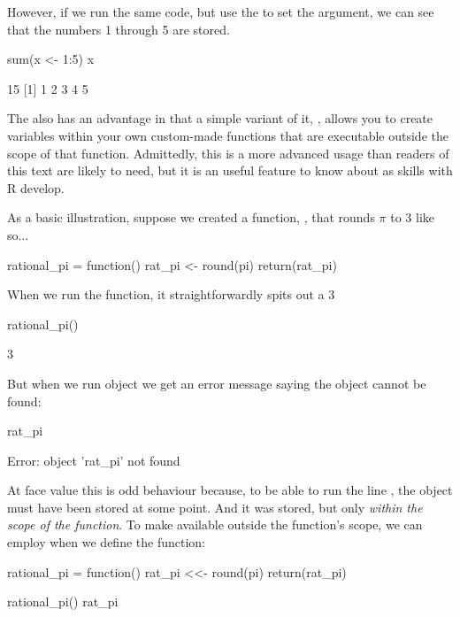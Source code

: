 \noindent
However, if we run the same code, but use the \R{<-} to set the argument, we can see that the numbers 1 through 5 are stored.

\begin{inR}
sum(x <- 1:5)
x
\end{inR}

\begin{outR}
[1] 15
[1] 1 2 3 4 5
\end{outR}

The \R{<-} also has an advantage in that a simple variant of it, \R{{<}<-}, allows you to create variables within your own custom-made functions that are executable outside the scope of that function. Admittedly, this is a more advanced usage than readers of this text are likely to need, but it is an useful feature to know about as skills with R develop.

As a basic illustration, suppose we created a function, , that rounds $\pi$ to 3 like so...

\begin{inR}
rational_pi = function() {
  rat_pi <- round(pi)
  return(rat_pi)
}
\end{inR}

\medskip

\noindent
When we run the function, it straightforwardly spits out a 3

\begin{inR}
rational_pi()
\end{inR}

\begin{outR}
[1] 3
\end{outR}

\noindent
But when we run object  we get an error message saying the object cannot be found:

\begin{inR}
rat_pi
\end{inR}

\begin{outR}
Error: object 'rat_pi' not found
\end{outR}

\noindent
At face value this is odd behaviour because, to be able to run the line , the object  must have been stored at some point.  And it was stored, but only \textit{within the scope of the function}. To make  available outside the function's scope, we can employ \R{{<}<-} when we define the function:

\begin{inR}
rational_pi = function() {
  rat_pi <<- round(pi)
  return(rat_pi)
}

rational_pi()
rat_pi
\end{inR}

